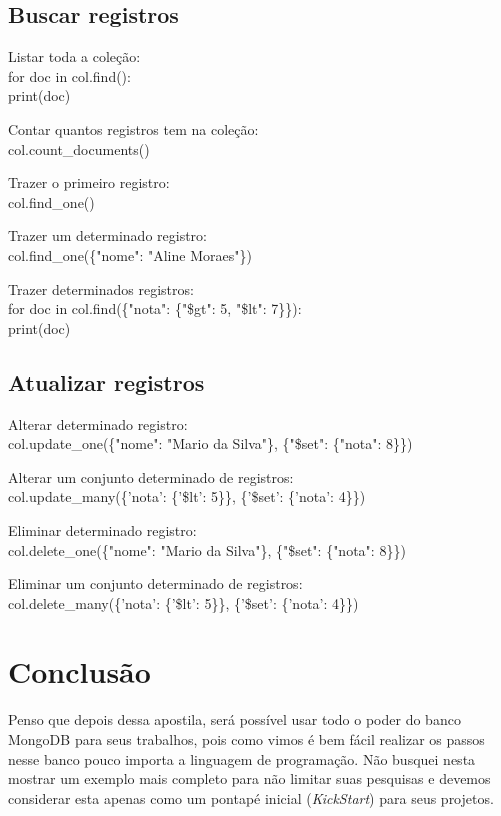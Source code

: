 \documentclass[a4paper,11pt]{article}
\begin{document}
\subsection{Buscar registros}
Listar toda a coleção: \\
{\ttfamily for doc in col.find({}): \\
\phantom{x}\hspace{4pt} print(doc)}

Contar quantos registros tem na coleção: \\
{\ttfamily col.count\_documents({})}

Trazer o primeiro registro: \\
{\ttfamily col.find\_one()}

Trazer um determinado registro: \\
{\ttfamily col.find\_one(\{"nome": "Aline Moraes"\})}

Trazer determinados registros: \\
{\ttfamily for doc in col.find(\{"nota": \{"\$gt": 5, "\$lt": 7\}\}): \\
\phantom{x}\hspace{4pt} print(doc)}

\subsection{Atualizar registros}
Alterar determinado registro: \\
{\ttfamily col.update\_one(\{"nome": "Mario da Silva"\}, \{"\$set": \{"nota": 8\}\})}

Alterar um conjunto determinado de registros: \\
{\ttfamily col.update\_many(\{'nota': \{'\$lt': 5\}\}, \{'\$set': \{'nota': 4\}\})}

Eliminar determinado registro: \\
{\ttfamily col.delete\_one(\{"nome": "Mario da Silva"\}, \{"\$set": \{"nota": 8\}\})}

Eliminar um conjunto determinado de registros: \\
{\ttfamily col.delete\_many(\{'nota': \{'\$lt': 5\}\}, \{'\$set': \{'nota': 4\}\})}

\section{Conclusão}
Penso que depois dessa apostila, será possível usar todo o poder do banco MongoDB para seus trabalhos, pois como vimos é bem fácil realizar os passos nesse banco pouco importa a linguagem de programação. Não busquei nesta mostrar um exemplo mais completo para não limitar suas pesquisas e devemos considerar esta apenas como um pontapé inicial (\textit{KickStart}) para seus projetos.
\end{document}
